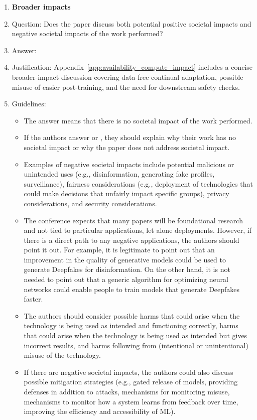 \documentclass{article}
\begin{document}
\begin{enumerate}
\item {\bf Broader impacts}
    \item[] Question: Does the paper discuss both potential positive societal impacts and negative societal impacts of the work performed?
    \item[] Answer: \answerYes{} %
    \item[] Justification: Appendix~\ref{app:availability_compute_impact} includes a concise broader-impact discussion covering data-free continual adaptation, possible misuse of easier post-training, and the need for downstream safety checks.
    \item[] Guidelines:
    \begin{itemize}
        \item The answer \answerNA{} means that there is no societal impact of the work performed.
        \item If the authors answer \answerNA{} or \answerNo, they should explain why their work has no societal impact or why the paper does not address societal impact.
        \item Examples of negative societal impacts include potential malicious or unintended uses (e.g., disinformation, generating fake profiles, surveillance), fairness considerations (e.g., deployment of technologies that could make decisions that unfairly impact specific groups), privacy considerations, and security considerations.
        \item The conference expects that many papers will be foundational research and not tied to particular applications, let alone deployments. However, if there is a direct path to any negative applications, the authors should point it out. For example, it is legitimate to point out that an improvement in the quality of generative models could be used to generate Deepfakes for disinformation. On the other hand, it is not needed to point out that a generic algorithm for optimizing neural networks could enable people to train models that generate Deepfakes faster.
        \item The authors should consider possible harms that could arise when the technology is being used as intended and functioning correctly, harms that could arise when the technology is being used as intended but gives incorrect results, and harms following from (intentional or unintentional) misuse of the technology.
        \item If there are negative societal impacts, the authors could also discuss possible mitigation strategies (e.g., gated release of models, providing defenses in addition to attacks, mechanisms for monitoring misuse, mechanisms to monitor how a system learns from feedback over time, improving the efficiency and accessibility of ML).
    \end{itemize}
    

\end{enumerate}
\end{document}
